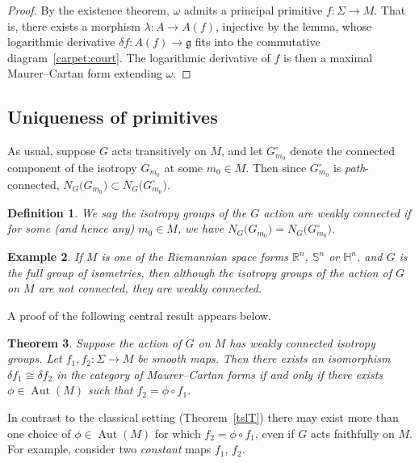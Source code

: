 \documentclass[11pt]{article}
\numberwithin{equation}{section}
\numberwithin{equation}{section}
\newtheorem{Theorem}{Theorem}[section]
\newtheorem{Definition}[Theorem]{Definition}
\newtheorem{Example}[Theorem]{Example}
\DeclareMathOperator{\automorphism}{Aut}
\begin{document}
\begin{proof} By the existence theorem, $\omega $ admits a principal
 primitive $f \colon\! \Sigma \rightarrow M$. That is, there exists a
 morphism $\lambda \colon\! A \rightarrow A(f)$, injective by the
 lemma, whose logarithmic derivative
 $\delta f \colon\! A(f) \rightarrow {\mathfrak g} $ fits into the
 commutative diagram~\eqref{carpet:court}. The logarithmic
 derivative of $f$ is then a maximal Maurer--Cartan form extending
 $\omega $.
\end{proof}

\subsection*{Uniqueness of primitives}%

As usual, suppose $G$ acts transitively on $M$, and let
$G_{m_0}^\circ $ denote the connected component of the isotropy
$G_{m_0}$ at some $m_0 \in M$. Then since $G_{m_0}^\circ$ is {\em
 path}-connected, $N_G\big(G_{m_0}\big)\subset N_G\big(G_{m_0}^\circ\big)$.
\begin{Definition}%
 We say the isotropy groups of the $G$ action are {\it weakly
 connected} if for some (and hence any) $m_0 \in M$, we have
 $N_G\big(G_{m_0}\big)=N_G\big(G_{m_0}^\circ\big)$.
\end{Definition}

\begin{Example} If $M $ is one of the Riemannian space forms ${\mathbb
R}^n$, ${\mathbb S}^n$ or ${\mathbb H}^n $, and $G$ is the full group of
isometries, then although the isotropy groups of the action of $G$ on
$M$ are not connected, they {\em are} weakly connected.
\end{Example}
A proof of the following central result appears below.

\begin{Theorem}\label{uniquenessT}
 Suppose the action of $G$ on $M$ has weakly connected isotropy
 groups. Let $f_1, f_2 \colon \Sigma \rightarrow M$ be smooth
 maps. Then there exists an isomorphism $\delta f_1 \cong \delta f_2$
 in the category of Maurer--Cartan forms {\em if and only if} there
 exists $\phi \in \automorphism(M)$ such that
 $f_2 = \phi \circ f_1$.
\end{Theorem}

In contrast to the classical setting (Theorem~\ref{tslT})
there may exist more than one choice of $\phi \in \automorphism(M)$
for which $f_2 = \phi \circ f_1$, even if $G$ acts faithfully on
$M$. For example, consider two {\em constant} maps $f_1$, $f_2$.
\end{document}
